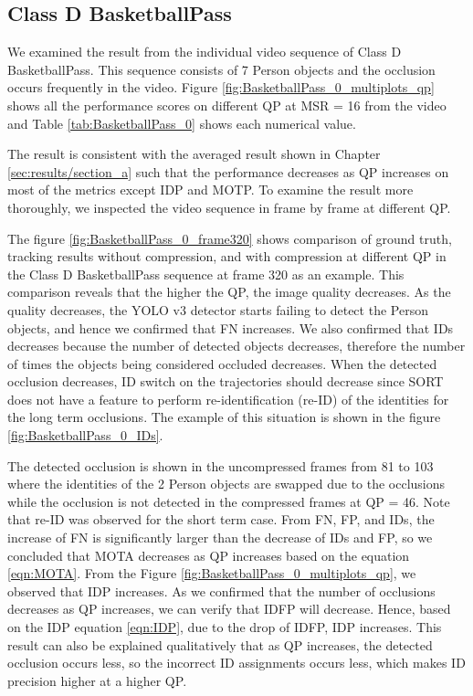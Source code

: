 \subsection{Class D BasketballPass}
We examined the result from the individual video sequence of Class D BasketballPass. This sequence consists of 7 Person objects and the occlusion occurs frequently in the video.  Figure \ref{fig:BasketballPass_0_multiplots_qp} shows all the performance scores on different QP at MSR = 16 from the video and Table \ref{tab:BasketballPass_0} shows each numerical value. 


The result is consistent with the averaged result shown in Chapter \ref{sec:results/section_a} such that the performance decreases as QP increases on most of the metrics except IDP and MOTP. To examine the result more thoroughly, we inspected the video sequence in frame by frame at different QP.

The figure \ref{fig:BasketballPass_0_frame320} shows comparison of ground truth, tracking results without compression, and with compression at different QP in the Class D BasketballPass sequence at frame 320 as an example. This comparison reveals that the higher the QP, the image quality decreases. As the quality decreases, the YOLO v3 detector starts failing to detect the Person objects, and hence we confirmed that FN increases. We also confirmed that IDs decreases because the number of detected objects decreases, therefore the number of times the objects being considered occluded decreases. When the detected occlusion decreases, ID switch on the trajectories should decrease since SORT does not have a feature to perform re-identification (re-ID) of the identities for the long term occlusions. The example of this situation is shown in the figure \ref{fig:BasketballPass_0_IDs}.

The detected occlusion is shown in the uncompressed frames from 81 to 103 where the identities of the 2 Person objects are swapped due to the occlusions while the occlusion is not detected in the compressed frames at QP = 46. Note that re-ID was observed for the short term case. From FN, FP, and IDs, the increase of FN is significantly larger than the decrease of IDs and FP, so we concluded that MOTA decreases as QP increases based on the equation \ref{eqn:MOTA}. From the Figure \ref{fig:BasketballPass_0_multiplots_qp}, we observed that IDP increases. As we confirmed that the number of occlusions decreases as QP increases, we can verify that IDFP will decrease. Hence, based on the IDP equation \ref{eqn:IDP}, due to the drop of IDFP, IDP increases. This result can also be explained qualitatively that as QP increases, the detected occlusion occurs less, so the incorrect ID assignments occurs less, which makes ID precision higher at a higher QP.

